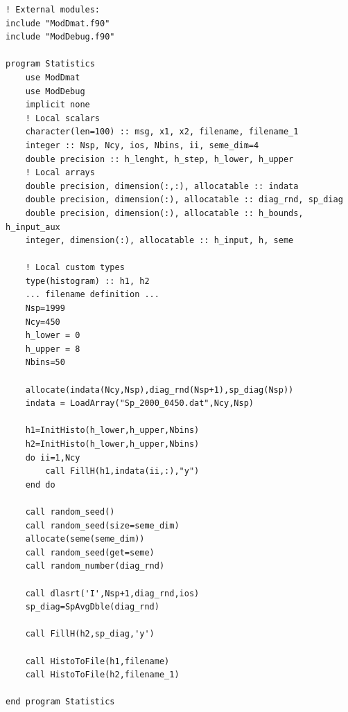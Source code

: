 \documentclass[a4paper]{article}
\begin{document}
\begin{lstlisting}
! External modules:
include "ModDmat.f90"
include "ModDebug.f90"

program Statistics
    use ModDmat
    use ModDebug
    implicit none
    ! Local scalars
    character(len=100) :: msg, x1, x2, filename, filename_1
    integer :: Nsp, Ncy, ios, Nbins, ii, seme_dim=4
    double precision :: h_lenght, h_step, h_lower, h_upper
    ! Local arrays
    double precision, dimension(:,:), allocatable :: indata
    double precision, dimension(:), allocatable :: diag_rnd, sp_diag
    double precision, dimension(:), allocatable :: h_bounds, h_input_aux
    integer, dimension(:), allocatable :: h_input, h, seme
    
    ! Local custom types
    type(histogram) :: h1, h2
    ... filename definition ...
    Nsp=1999
    Ncy=450
    h_lower = 0
    h_upper = 8
    Nbins=50

    allocate(indata(Ncy,Nsp),diag_rnd(Nsp+1),sp_diag(Nsp))
    indata = LoadArray("Sp_2000_0450.dat",Ncy,Nsp)

    h1=InitHisto(h_lower,h_upper,Nbins)
    h2=InitHisto(h_lower,h_upper,Nbins)
    do ii=1,Ncy
        call FillH(h1,indata(ii,:),"y")
    end do

    call random_seed()
    call random_seed(size=seme_dim)
    allocate(seme(seme_dim))
    call random_seed(get=seme)
    call random_number(diag_rnd)
    
    call dlasrt('I',Nsp+1,diag_rnd,ios)
    sp_diag=SpAvgDble(diag_rnd)

    call FillH(h2,sp_diag,'y')
    
    call HistoToFile(h1,filename)
    call HistoToFile(h2,filename_1)

end program Statistics
\end{lstlisting}
\end{document}
